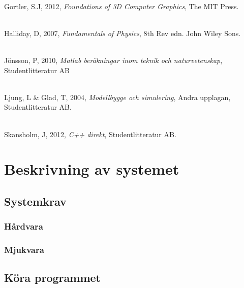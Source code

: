 \documentclass[a4paper,12pt,oneside,final,swedish]{extarticle}
\begin{document}
\noindent \\Gortler, S.J, 2012, \textit{Foundations of 3D Computer Graphics}, The MIT Press.

\noindent \\Halliday, D, 2007, \textit{Fundamentals of Physics}, 8th Rev edn. John Wiley Sons.

\noindent \\Jönsson, P, 2010, \textit{Matlab beräkningar inom teknik och naturvetenskap}, Studentlitteratur AB

\noindent \\Ljung, L \& Glad, T, 2004, \textit{Modellbygge och simulering}, Andra upplagan, Studentlitteratur AB.

\noindent \\Skansholm, J, 2012, \textit{C++ direkt}, Studentlitteratur AB.




\appendix

\section{Beskrivning av systemet}
\subsection{Systemkrav}
\subsubsection{Hårdvara}
\subsubsection{Mjukvara}

\subsection{Köra programmet}
\end{document}
